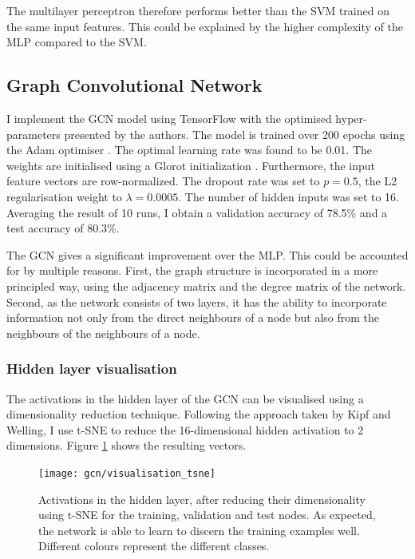 \documentclass[12pt]{article}
\theoremstyle{definition}
\begin{document}
\bigskip

The multilayer perceptron therefore performs better than the SVM trained on the same input features. This could be explained by the higher complexity of the MLP compared to the SVM.

\subsection{Graph Convolutional Network}

I implement the GCN model using TensorFlow with the optimised hyper-parameters presented by the authors. The model is trained over 200 epochs using the Adam optimiser \cite{kingma2014adam}. The optimal learning rate was found to be 0.01. The weights are initialised using a Glorot initialization \cite{glorot2010understanding}. Furthermore, the input feature vectors are row-normalized. The dropout rate was set to $p=0.5$, the L2 regularisation weight to $\lambda=0.0005$. The number of hidden inputs was set to 16. Averaging the result of 10 runs, I obtain a validation accuracy of 78.5\% and a test accuracy of 80.3\%.

\bigskip

The GCN gives a significant improvement over the MLP. This could be accounted for by multiple reasons. First, the graph structure is incorporated in a more principled way, using the adjacency matrix and the degree matrix of the network. Second, as the network consists of two layers, it has the ability to incorporate information not only from the direct neighbours of a node but also from the neighbours of the neighbours of a node.

\subsubsection{Hidden layer visualisation}

The activations in the hidden layer of the GCN can be visualised using a dimensionality reduction technique. Following the approach taken by Kipf and Welling, I use t-SNE \cite{maaten2008visualizing} to reduce the 16-dimensional hidden activation to 2 dimensions. Figure \ref{fig/gcn_tsne} shows the resulting vectors.

\begin{figure}[h]
	\texttt{[image: gcn/visualisation\_tsne]}
	\centering
	\caption{Activations in the hidden layer, after reducing their dimensionality using t-SNE for the training, validation and test nodes. As expected, the network is able to learn to discern the training examples well. Different colours represent the different classes.}
	\label{fig/gcn_tsne}
\end{figure}
\end{document}
